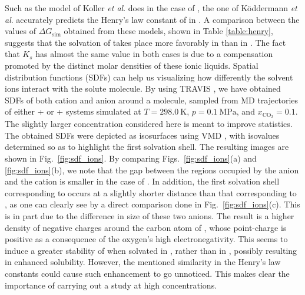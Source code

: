 \documentclass[3p,twocolumn]{elsarticle}
\begin{document}
Such as the model of Koller \textit{et al}. \cite{Koller_2012} does in the case of \ce{[emim][B(CN)_4]}, the one of K\"{o}ddermann \textit{et al}. \cite{Koddermann_2007} accurately predicts the Henry's law constant of  in \ce{[emim][NTf_2]}.
A comparison between the values of $\Delta G_\text{sim}$ obtained from these models, shown in Table \ref{table:henry}, suggests that the solvation of  takes place more favorably in \ce{[emim][B(CN)_4]} than in \ce{[emim][NTf_2]}.
The fact that $K_s$ has almost the same value in both cases is due to a compensation promoted by the distinct molar densities of these ionic liquids.
Spatial distribution functions (SDFs) \cite{Svishchev_1993} can help us visualizing how differently the solvent ions interact with the solute molecule.
By using TRAVIS \cite{Brehm_2011}, we have obtained SDFs of both cation and anion around a  molecule, sampled from MD trajectories of either +\ce{[emim][B(CN)_4]} or +\ce{[emim][NTf_2]} systems simulated at $T = 298.0~\text{K}$, $p = 0.1~\mathrm{MPa}$, and $x_\mathrm{CO_2} = 0.1$.
The slightly larger  concentration considered here is meant to improve statistics.
The obtained SDFs were depicted as isosurfaces using VMD \cite{HUMP96}, with isovalues determined so as to highlight the first solvation shell.
The resulting images are shown in Fig.~\ref{fig:sdf_ions}.
By comparing Figs.~\ref{fig:sdf_ions}(a) and \ref{fig:sdf_ions}(b), we note that the gap between the regions occupied by the anion and the cation is smaller in the case of \ce{[emim][B(CN)_4]}.
In addition, the first solvation shell corresponding to \ce{[B(CN)_4]^-} occurs at a slightly shorter distance than that corresponding to \ce{[NTf_2]^-}, as one can clearly see by a direct comparison done in Fig.~\ref{fig:sdf_ions}(c).
This is in part due to the difference in size of these two anions.
The result is a higher density of negative charges around the carbon atom of , whose point-charge is positive as a consequence of the oxygen's high electronegativity.
This seems to induce a greater stability of  when solvated in \ce{[emim][B(CN)_4]}, rather than in \ce{[emim][NTf_2]}, possibly resulting in enhanced solubility.
However, the mentioned similarity in the Henry's law constants could cause such enhancement to go unnoticed.
This makes clear the importance of carrying out a study at high  concentrations.
\end{document}
